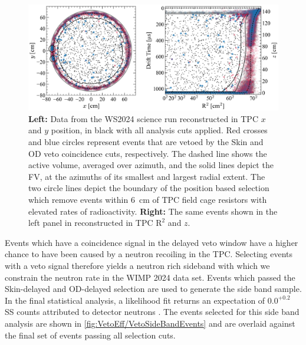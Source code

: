 \begin{figure}[ht!]
    \centering
    \includegraphics[width=\linewidth]{figures/VetoEfficiency/WS2024_TPCPosPlots_2panel.png}
    \caption{\textbf{Left:} Data from the WS2024 science run reconstructed in TPC $x$ and $y$ position, in black with all analysis cuts applied. Red crosses and blue circles represent events that are vetoed by the Skin and OD veto coincidence cuts, respectively. The dashed line shows the active volume, averaged over azimuth, and the solid lines depict the FV, at the azimuths of its smallest and largest radial extent. The two circle lines depict the boundary of the position based selection which remove events within 6~cm of TPC field cage resistors with elevated rates of radioactivity. \textbf{Right:} The same events shown in the left panel in reconstructed in TPC $\text{R}^2$ and $z$.}
    \label{fig:VetoEff/WS2024_TPCPosPlots_2panel}
\end{figure}

Events which have a coincidence signal in the delayed veto window have a higher chance to have been caused by a neutron recoiling in the TPC. Selecting events with a veto signal therefore yields a neutron rich sideband with which we constrain the neutron rate in the WIMP 2024 data set.
Events which passed the Skin-delayed and OD-delayed selection are used to generate the side band sample. In the final statistical analysis, a likelihood fit returns an expectation of $0.0^{+0.2}$ SS counts attributed to detector neutrons \cite{LZCollaboration:2024lux}. The events selected for this side band analysis are shown in \autoref{fig:VetoEff/VetoSideBandEvents} and are overlaid against the final set of events passing all selection cuts. 

